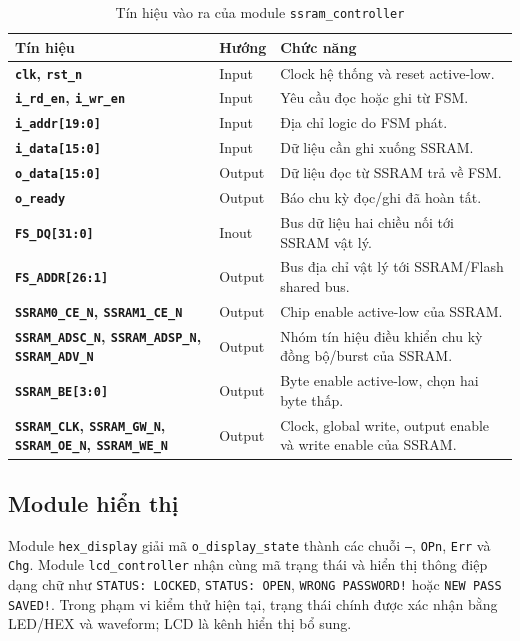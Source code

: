 \documentclass[13pt,a4paper]{article}
\begin{document}
\begin{table}[H]
\centering
\caption{Tín hiệu vào ra của module \texttt{ssram\_controller}}
\label{tab:io_ssram_controller}
\small
\begin{tabularx}{\textwidth}{|>{\bfseries}p{3.8cm}|p{1.8cm}|X|}
\hline
\textbf{Tín hiệu} & \textbf{Hướng} & \textbf{Chức năng}\\
\hline
\texttt{clk}, \texttt{rst\_n} & Input & Clock hệ thống và reset active-low.\\
\hline
\texttt{i\_rd\_en}, \texttt{i\_wr\_en} & Input & Yêu cầu đọc hoặc ghi từ FSM.\\
\hline
\texttt{i\_addr[19:0]} & Input & Địa chỉ logic do FSM phát.\\
\hline
\texttt{i\_data[15:0]} & Input & Dữ liệu cần ghi xuống SSRAM.\\
\hline
\texttt{o\_data[15:0]} & Output & Dữ liệu đọc từ SSRAM trả về FSM.\\
\hline
\texttt{o\_ready} & Output & Báo chu kỳ đọc/ghi đã hoàn tất.\\
\hline
\texttt{FS\_DQ[31:0]} & Inout & Bus dữ liệu hai chiều nối tới SSRAM vật lý.\\
\hline
\texttt{FS\_ADDR[26:1]} & Output & Bus địa chỉ vật lý tới SSRAM/Flash shared bus.\\
\hline
\texttt{SSRAM0\_CE\_N}, \texttt{SSRAM1\_CE\_N} & Output & Chip enable active-low của SSRAM.\\
\hline
\texttt{SSRAM\_ADSC\_N}, \texttt{SSRAM\_ADSP\_N}, \texttt{SSRAM\_ADV\_N} & Output & Nhóm tín hiệu điều khiển chu kỳ đồng bộ/burst của SSRAM.\\
\hline
\texttt{SSRAM\_BE[3:0]} & Output & Byte enable active-low, chọn hai byte thấp.\\
\hline
\texttt{SSRAM\_CLK}, \texttt{SSRAM\_GW\_N}, \texttt{SSRAM\_OE\_N}, \texttt{SSRAM\_WE\_N} & Output & Clock, global write, output enable và write enable của SSRAM.\\
\hline
\end{tabularx}
\end{table}
\normalsize

\subsection{Module hiển thị}
Module \texttt{hex\_display} giải mã \texttt{o\_display\_state} thành các chuỗi \texttt{---}, \texttt{OPn}, \texttt{Err} và \texttt{Chg}. Module \texttt{lcd\_controller} nhận cùng mã trạng thái và hiển thị thông điệp dạng chữ như \texttt{STATUS: LOCKED}, \texttt{STATUS: OPEN}, \texttt{WRONG PASSWORD!} hoặc \texttt{NEW PASS SAVED!}. Trong phạm vi kiểm thử hiện tại, trạng thái chính được xác nhận bằng LED/HEX và waveform; LCD là kênh hiển thị bổ sung.
\end{document}

